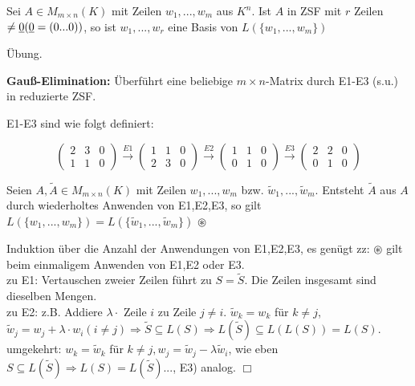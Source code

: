 \begin{lem}
	Sei $A\in M_{m\times n}(K)$ mit Zeilen $w_1,...,w_m$ aus $K^n$. Ist $A$ in ZSF mit $r$ Zeilen $\neq\uline{0} (\uline{0}=(0...0))$, so ist $w_1,...,w_r$ eine Basis von $L(\{w_1,...,w_m\})$
\end{lem}

\begin{bew}
	Übung.
\end{bew}

\noindent\textbf{Gauß-Elimination:} Überführt eine beliebige $m\times n$-Matrix durch  E1-E3 (s.u.) in reduzierte ZSF.

\begin{defi}
	E1-E3 sind wie folgt definiert:
\end{defi}

\begin{bsp}
	\[\begin{pmatrix}
	2 & 3 & 0\\
	1 & 1 & 0
	\end{pmatrix}\stackrel{E1}{\rightarrow}
	\begin{pmatrix}
	1 & 1 & 0\\
	2 & 3 & 0
	\end{pmatrix}\stackrel{E2}{\rightarrow}
	\begin{pmatrix}
	1 & 1 & 0\\
	0 & 1 & 0
	\end{pmatrix}\stackrel{E3}{\rightarrow}
	\begin{pmatrix}
	2 & 2 & 0\\
	0 & 1 & 0
	\end{pmatrix}\]
\end{bsp}

\begin{lem}
	Seien $A,\tilde{A}\in M_{m\times n}(K)$ mit Zeilen $w_1,...,w_m$ bzw. $\tilde{w}_1,...,\tilde{w}_m$. Entsteht $\tilde{A}$ aus $A$ durch wiederholtes Anwenden von E1,E2,E3, so gilt $L(\{w_1,...,w_m\})=L(\{\tilde{w}_1,...,\tilde{w}_m\})$ $\circledast$
\end{lem}

\begin{bew}
	Induktion über die Anzahl der Anwendungen von E1,E2,E3, es genügt zz: $\circledast$ gilt beim einmaligem Anwenden von E1,E2 oder E3.\\
	zu E1: Vertauschen zweier Zeilen führt zu $S=\tilde{S}$. Die Zeilen insgesamt sind dieselben Mengen.\\
	zu E2: z.B. Addiere $\lambda\cdot$ Zeile $i$ zu Zeile $j\neq i$. $\tilde{w}_k =w_k$ für $k\neq j$, $\tilde{w}_j=w_j +\lambda\cdot w_i (i\neq j)\Rightarrow \tilde{S}\subseteq L(S)\Rightarrow L(\tilde{S})\subseteq L(L(S))=L(S)$. umgekehrt: $w_k=\tilde{w}_k$ für $k\neq j, w_j=\tilde{w}_j -\lambda\tilde{w}_i$, wie eben $S\subseteq L(\tilde{S})\Rightarrow L(S)=L(\tilde{S})$..., E3) analog. \hfill $\Box$
\end{bew}

